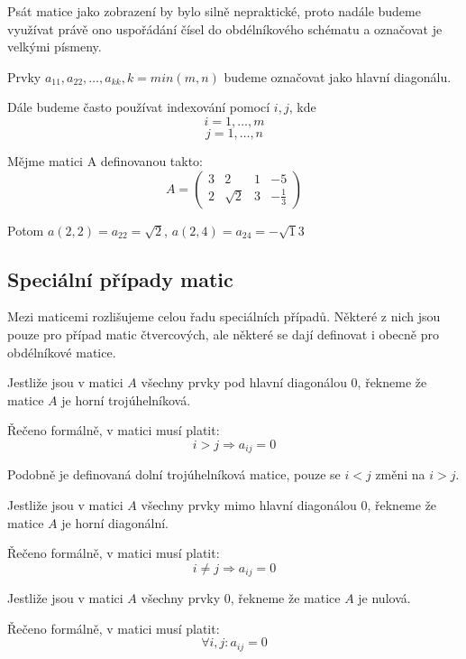 Psát matice jako zobrazení by bylo silně nepraktické, proto nadále budeme využívat
právě ono uspořádání čísel do obdélníkového schématu a označovat je velkými písmeny.

Prvky $a_{11}, a_{22}, \ldots, a_{kk}, k = min(m, n)$ budeme označovat jako hlavní
diagonálu.

Dále budeme často používat indexování pomocí $i, j$, kde
$$i = 1, \ldots, m$$
$$j = 1, \ldots, n$$

\begin{example}[Matice]

    Mějme matici A definovanou takto:
    $$ A = \begin{pmatrix}
        3 & 2 & 1 & -5 \\
        2 & \sqrt{2} & 3 & -\frac{1}{3}
        \end{pmatrix}  $$

    Potom $a(2, 2) = a_{22} = \sqrt{2}$, $a(2, 4) = a_{24} = -\sqrt{1}{3}$
\end{example}

\subsection{Speciální případy matic}
Mezi maticemi rozlišujeme celou řadu speciálních případů. Některé z nich jsou pouze
pro případ matic čtvercových, ale některé se dají definovat i obecně pro obdélníkové matice.

\begin{definition}
    Jestliže jsou v matici $A$ všechny prvky pod hlavní diagonálou 0,
    řekneme že matice $A$ je horní trojúhelníková.

    Řečeno formálně, v matici musí platit:
    $$i > j \Rightarrow a_{ij} = 0$$

    Podobně je definovaná dolní trojúhelníková matice, pouze se $i < j$ změni na $i > j$.
\end{definition}

\begin{definition}
    Jestliže jsou v matici $A$ všechny prvky mimo hlavní diagonálou 0,
    řekneme že matice $A$ je horní diagonální.

    Řečeno formálně, v matici musí platit:
    $$i \neq j \Rightarrow a_{ij} = 0$$
\end{definition}

\begin{definition}
    Jestliže jsou v matici $A$ všechny prvky 0,
    řekneme že matice $A$ je nulová.

    Řečeno formálně, v matici musí platit:
    $$\forall i,j: a_{ij} = 0$$
\end{definition}

